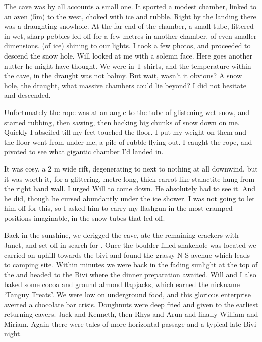 The cave was by all accounts a small one. It sported a modest chamber, linked to an aven (5m) to the west, choked with ice and rubble. Right by the landing there was a draughting snowhole. At the far end of the chamber, a small tube, littered in wet, sharp pebbles led off for  a few metres in another chamber, of even smaller dimensions.  (of ice) shining to our lights. I took a few photos, and proceeded to descend the snow hole. Will looked at me with a solemn face. Here goes another nutter he might have thought. We were in T-shirts, and the temperature within the cave, in the draught was not balmy. But wait, wasn't it obvious? A snow hole, the draught, what massive chambers could lie beyond? I did not hesitate and descended.

Unfortunately the rope was at an angle to the tube of glistening wet snow, and started rubbing, then sawing, then hacking big chunks of snow down on me. Quickly I abseiled till my feet touched the floor. I put my weight on them and the floor went from under me, a pile of rubble flying out. I caught the rope, and pivoted to see what gigantic chamber I'd landed in. 

It was cosy, a 2 m wide rift, degenerating to next to nothing at all downwind, but it was worth it, for a glittering, metre long, thick carrot like stalactite hung from the right hand wall. I urged Will to come down. He absolutely had to see it. And he did, though he cursed abundantly under the ice shower. I was not going to let him off for this, so I asked him to carry my flashgun in the most cramped positions imaginable, in the snow tubes that led off. 




Back in the sunshine, we derigged the cave, ate the remaining crackers with Janet, and set off in search for . Once the boulder-filled shakehole was located we carried on uphill towards the bivi and found the grassy N-S avenue which leads to camping site. Within minutes we were back in the fading sunlight at the top of the  and headed to the Bivi where the dinner preparation awaited. Will and I also baked some cocoa and ground almond flapjacks, which earned the nickname `Tanguy Treats'. We were low on underground food, and this glorious enterprise averted a chocolate bar crisis. Doughnuts were deep fried and given to the earliest returning cavers. Jack and Kenneth, then Rhys and Arun and finally William and Miriam. Again there were tales of more horizontal passage and a typical late Bivi night. 



